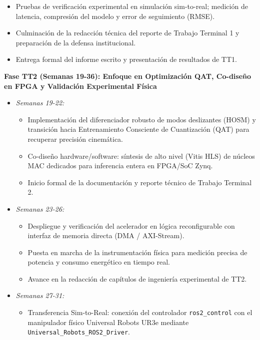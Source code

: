 \documentclass[12pt]{article}
\begin{document}
\begin{itemize}
\begin{itemize}
            \item [EP05] Pruebas de verificación experimental en simulación sim-to-real; medición de latencia, compresión del modelo y error de seguimiento (RMSE).
            \item [DOC1] Culminación de la redacción técnica del reporte de Trabajo Terminal 1 y preparación de la defensa institucional.
            \item [ENT1] Entrega formal del informe escrito y presentación de resultados de TT1.
        \end{itemize}
\end{itemize}

\textbf{Fase TT2 (Semanas 19-36): Enfoque en Optimización QAT, Co-diseño en FPGA y Validación Experimental Física}
\begin{itemize}
    \item \textit{Semanas 19-22:}
        \begin{itemize}
            \item [EP06] Implementación del diferenciador robusto de modos deslizantes (HOSM) y transición hacia Entrenamiento Consciente de Cuantización (QAT) para recuperar precisión cinemática.
            \item [EP07] Co-diseño hardware/software: síntesis de alto nivel (Vitis HLS) de núcleos MAC dedicados para inferencia entera en FPGA/SoC Zynq.
            \item [DOC2] Inicio formal de la documentación y reporte técnico de Trabajo Terminal 2.
        \end{itemize}
    \item \textit{Semanas 23-26:}
        \begin{itemize}
            \item [EP07] Despliegue y verificación del acelerador en lógica reconfigurable con interfaz de memoria directa (DMA / AXI-Stream).
            \item [EP08] Puesta en marcha de la instrumentación física para medición precisa de potencia y consumo energético en tiempo real.
            \item [DOC2] Avance en la redacción de capítulos de ingeniería experimental de TT2.
        \end{itemize}
    \item \textit{Semanas 27-31:}
        \begin{itemize}
            \item [EP09] Transferencia Sim-to-Real: conexión del controlador \texttt{ros2\_control} con el manipulador físico Universal Robots UR3e mediante \texttt{Universal\_Robots\_ROS2\_Driver}.

\end{itemize}
\end{itemize}
\end{document}
